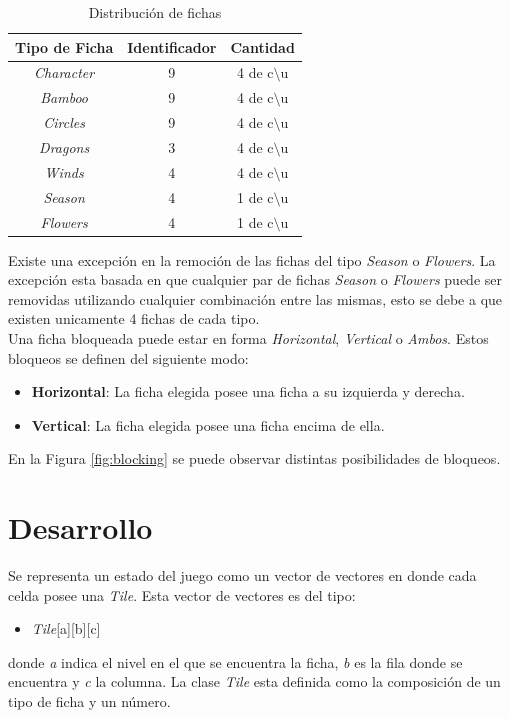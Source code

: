 \documentclass{sig-alternate}
\begin{document}
\begin{table}[h]
\begin{center}
	\begin{tabular}{|c|c|c|}
	\hline
	 Tipo de Ficha & Identificador & Cantidad\\
	\hline \hline
	\textit{Character} & 9 & 4 de c$\setminus$u \\
	\textit{Bamboo} & 9 & 4 de  c$\setminus$u  \\
	\textit{Circles} & 9 & 4 de  c$\setminus$u  \\
	\textit{Dragons} & 3 & 4 de  c$\setminus$u  \\	
	\textit{Winds} & 4 & 4 de  c$\setminus$u  \\
	\textit{Season} & 4 & 1 de c$\setminus$u \\
	\textit{Flowers} & 4 & 1 de  c$\setminus$u  \\
	\hline
	\end{tabular}
\end{center}
\caption{Distribuci\'on de fichas}
\label{tab:tiles}
\end{table}

	Existe una excepci\'on en la remoci\'on de las fichas del tipo \textit{Season} o \textit{Flowers}. La excepci\'on esta basada en que cualquier par de fichas \textit{Season} o \textit{Flowers} puede ser removidas utilizando cualquier combinaci\'on entre las mismas, esto se debe a que existen unicamente 4 fichas de cada tipo. \\
	Una ficha bloqueada puede estar en forma \textit{Horizontal}, \textit{Vertical} o \textit{Ambos}. Estos bloqueos se definen del siguiente modo:
	\begin{itemize}
		\item \textbf{Horizontal}: La ficha elegida posee una ficha a su izquierda y derecha.
		\item \textbf{Vertical}: La ficha elegida posee una ficha encima de ella.		
	\end{itemize}
	En la Figura \ref{fig:blocking} se puede observar distintas posibilidades de bloqueos.
\section*{Desarrollo}

	Se representa un estado del juego como un vector de vectores en donde cada celda posee una \textit{Tile}. Esta vector de vectores es del tipo:
	\begin{itemize}
		\item \textit{Tile}[a][b][c]
	\end{itemize}
	donde \textit{a} indica el nivel en el que se encuentra la ficha, \textit{b} es la fila donde se encuentra y \textit{c} la columna. La clase \textit{Tile} esta definida como la composici\'on de un tipo de ficha y un n\'umero.
	
\end{document}
